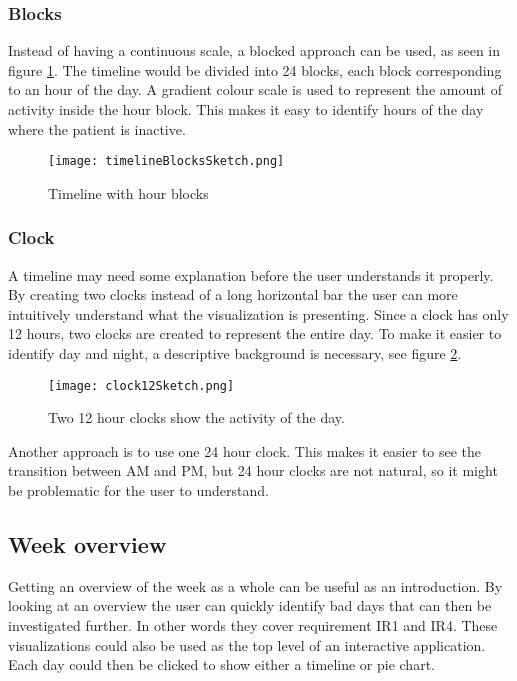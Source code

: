 \subsubsection{Blocks}
Instead of having a continuous scale, a blocked approach can be used, as seen in figure \ref{fig:timelineBlocks}. The timeline would be divided into 24 blocks, each block corresponding to an hour of the day. A gradient colour scale is used to represent the amount of activity inside the hour block. This makes it easy to identify hours of the day where the patient is inactive. 

\begin{figure}[h!]
	\centering
		\texttt{[image: timelineBlocksSketch.png]}
		\caption{\footnotesize Timeline with hour blocks}
		\label{fig:timelineBlocks}
\end{figure}

\subsubsection{Clock}
A timeline may need some explanation before the user understands it properly. By creating two clocks instead of a long horizontal bar the user can more intuitively understand what the visualization is presenting. Since a clock has only 12 hours, two clocks are created to represent the entire day. To make it easier to identify day and night, a descriptive background is necessary, see figure \ref{fig:clock12}.

\begin{figure}[h!]
	\centering
		\texttt{[image: clock12Sketch.png]}
		\caption{\footnotesize Two 12 hour clocks show the activity of the day.}
		\label{fig:clock12}
\end{figure}

Another approach is to use one 24 hour clock. This makes it easier to see the transition between AM and PM, but 24 hour clocks are not natural, so it might be problematic for the user to understand.

\subsection{Week overview}
Getting an overview of the week as a whole can be useful as an introduction. By looking at an overview the user can quickly identify bad days that can then be investigated further. In other words they cover requirement IR1 and IR4. These visualizations could also be used as the top level of an interactive application. Each day could then be clicked to show either a timeline or pie chart.

